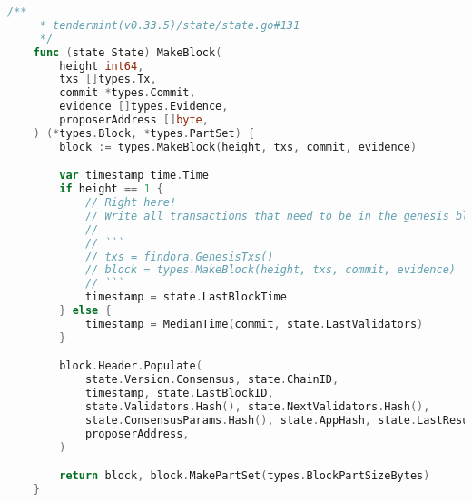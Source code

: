 \begin{lstlisting}[language=go]
    /**
     * tendermint(v0.33.5)/state/state.go#131
     */
    func (state State) MakeBlock(
        height int64,
        txs []types.Tx,
        commit *types.Commit,
        evidence []types.Evidence,
        proposerAddress []byte,
    ) (*types.Block, *types.PartSet) {
        block := types.MakeBlock(height, txs, commit, evidence)

        var timestamp time.Time
        if height == 1 {
            // Right here!
            // Write all transactions that need to be in the genesis block.
            //
            // ```
            // txs = findora.GenesisTxs()
            // block = types.MakeBlock(height, txs, commit, evidence)
            // ```
            timestamp = state.LastBlockTime
        } else {
            timestamp = MedianTime(commit, state.LastValidators)
        }

        block.Header.Populate(
            state.Version.Consensus, state.ChainID,
            timestamp, state.LastBlockID,
            state.Validators.Hash(), state.NextValidators.Hash(),
            state.ConsensusParams.Hash(), state.AppHash, state.LastResultsHash,
            proposerAddress,
        )

        return block, block.MakePartSet(types.BlockPartSizeBytes)
    }
\end{lstlisting}
